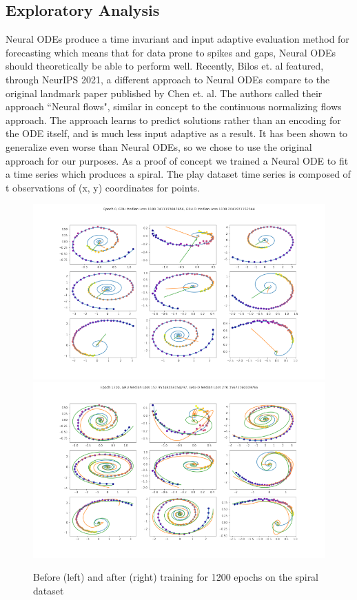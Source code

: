 \documentclass{article} %
\begin{document}
\subsection{Exploratory Analysis}
Neural ODEs produce a time invariant and input adaptive evaluation method for forecasting which means that for data prone to spikes and gaps, Neural ODEs should theoretically be able to perform well. Recently, Bilos et. al featured, through NeurIPS 2021, a different approach to Neural ODEs compare to the original landmark paper published by Chen et. al. The authors called their approach ``Neural flows", similar in concept to the continuous normalizing flows approach. The approach learns to predict solutions rather than an encoding for the ODE itself, and is much less input adaptive as a result. It has been shown to generalize even worse than Neural ODEs, so we chose to use the original approach for our purposes. As a proof of concept we trained a Neural ODE to fit a time series which produces a spiral. The play dataset time series is composed of t observations of (x, y) coordinates for points. 
\begin{figure}[!ht]
    \centering
    \includegraphics[scale=0.25]{vis0.png}
    \includegraphics[scale=0.25]{vis1200.png}
    \caption{Before (left) and after (right) training for 1200 epochs on the spiral dataset}
    \label{fig:my_label}
\end{figure}
\end{document}
